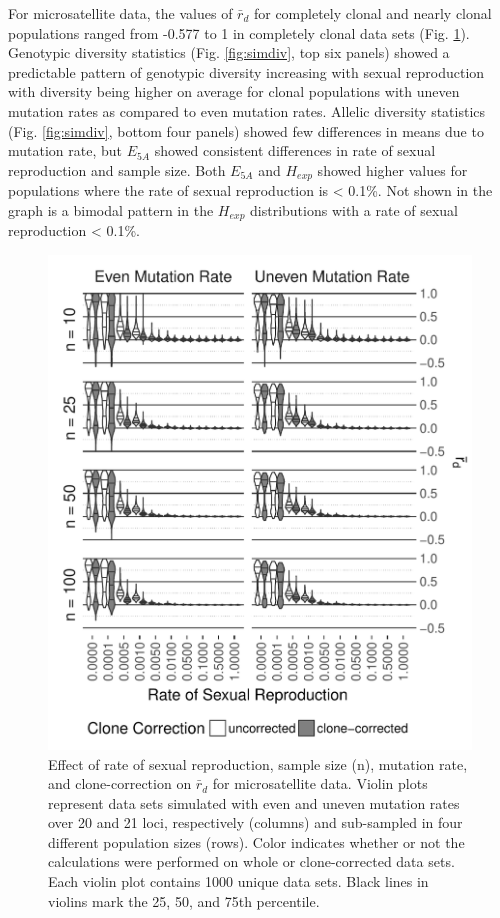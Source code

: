 \documentclass[]{article}
\theoremstyle{definition}
\theoremstyle{definition}
\theoremstyle{definition}
\theoremstyle{remark}
\begin{document}
For microsatellite data, the values of \(\bar{r}_d\) for completely
clonal and nearly clonal populations ranged from -0.577 to 1 in
completely clonal data sets (Fig. \ref{fig:sim1}). Genotypic diversity
statistics (Fig. \ref{fig:simdiv}, top six panels) showed a predictable
pattern of genotypic diversity increasing with sexual reproduction with
diversity being higher on average for clonal populations with uneven
mutation rates as compared to even mutation rates. Allelic diversity
statistics (Fig. \ref{fig:simdiv}, bottom four panels) showed few
differences in means due to mutation rate, but \(E_{5A}\) showed
consistent differences in rate of sexual reproduction and sample size.
Both \(E_{5A}\) and \(H_{exp}\) showed higher values for populations
where the rate of sexual reproduction is \textless{} 0.1\%. Not shown in
the graph is a bimodal pattern in the \(H_{exp}\) distributions with a
rate of sexual reproduction \textless{} 0.1\%.

\begin{figure}
\centering
\includegraphics[width=1.00000\textwidth]{figure/rd_sexrate.pdf}
\caption{Effect of rate of sexual reproduction, sample size (n),
mutation rate, and clone-correction on \(\bar{r}_d\) for microsatellite
data. Violin plots represent data sets simulated with even and uneven
mutation rates over 20 and 21 loci, respectively (columns) and
sub-sampled in four different population sizes (rows). Color indicates
whether or not the calculations were performed on whole or
clone-corrected data sets. Each violin plot contains 1000 unique data
sets. Black lines in violins mark the 25, 50, and 75th
percentile.}\label{fig:sim1}
\end{figure}
\end{document}
